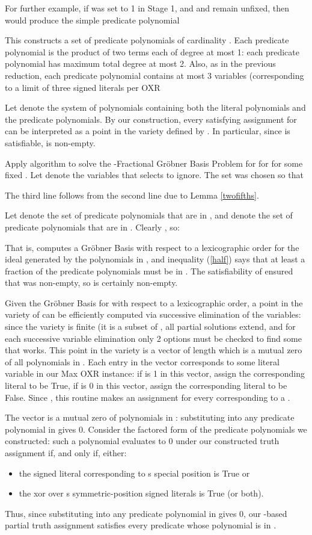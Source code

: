 \documentclass{article}
\begin{document}
For further example, if  was set to 1 in Stage 1, and  and  remain unfixed, then  would produce the simple predicate polynomial


This constructs a set of predicate polynomials of cardinality .
Each predicate polynomial is the product of two terms each of degree at most 1: each predicate polynomial has maximum total degree at most 2. Also, as in the previous reduction, each predicate polynomial contains at most 3 variables (corresponding to a limit of three signed literals per OXR

Let  denote the system of polynomials containing both the literal polynomials and the predicate polynomials. By our construction, every satisfying assignment for  can be interpreted as a point in the variety defined by . In particular, since  is satisfiable,  is non-empty.

Apply algorithm  to solve the -Fractional Gr\"{o}bner Basis Problem for  for  for some fixed . Let  denote the variables that  selects to ignore. The set  was chosen so that


The third line follows from the second line due to Lemma \ref{twofifths}. 

Let  denote the set of predicate polynomials that are in , and  denote the set of predicate polynomials that are in . Clearly , so:


That is,  computes a Gr\"{o}bner Basis with respect to a lexicographic order for the ideal generated by the polynomials in , and inequality (\ref{half}) says that at least a  fraction of the predicate polynomials must be in . The satisfiability of  ensured that  was non-empty, so  is certainly non-empty.

Given the Gr\"{o}bner Basis for  with respect to a lexicographic order, a point in the variety of  can be efficiently computed via successive elimination of the variables: since the variety is finite (it is a subset of , all partial solutions extend, and for each successive variable elimination only 2 options must be checked to find some  that works. This point in the variety is a vector  of length  which is a mutual zero of all polynomials in . Each entry in the vector corresponds to some literal variable in our Max OXR instance:
if  is 1 in this vector, assign the corresponding literal  to be True, if  is 0 in this vector, assign the corresponding literal  to be False. Since , this routine makes an assignment for every  corresponding to a  . 

The vector  is a mutual zero of polynomials in : substituting  into any predicate polynomial
in  gives 0. Consider the factored form of the predicate polynomials we constructed: such a polynomial evaluates to 0 under our constructed truth assignment if, and only if, either:
\begin{itemize}
\item 
the signed literal corresponding to s special position is True or 
\item the xor over s symmetric-position signed literals is True (or both). 
\end{itemize}
Thus, since substituting  into any predicate polynomial
in  gives 0, our -based partial truth assignment satisfies every predicate whose polynomial is in .\\
\end{document}

